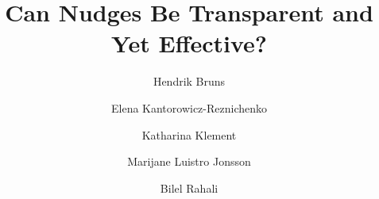 \documentclass[review, authoryear,12pt]{elsarticle}
\begin{document}
\begin{frontmatter}



\title{Can Nudges Be Transparent and Yet Effective?}


\author[First]{Hendrik Bruns}

\author[Second]{Elena Kantorowicz-Reznichenko}

\author[Third]{Katharina Klement}

\author[Fourth]{Marijane Luistro Jonsson}

\author[Fifth]{Bilel Rahali}


\address[First]{International Max-Planck Research School on Earth System Modelling, Bundesstr. 53, 20146 Hamburg, Germany; University of Hamburg, Welckerstr. 8, 20354 Hamburg, Germany}

\address[Second]{Erasmus University Rotterdam, P.O. Box 1738, 3000 DR Rotterdam, The Netherlands}

\address[Third]{Friedrich-Schiller-University Jena, 07737 Jena, Germany}

\address[Fourth]{Stockholm School of Economics, P.O. Box 6501, 11383 Stockholm, Sweden}

\address[Fifth]{Universit\'{e} de Grenoble Alpes-Institut National de la Recherche Agronomique UMR GAEL – CS 40 700, 38058 Grenoble Cedex, France}


\end{frontmatter}
\end{document}

